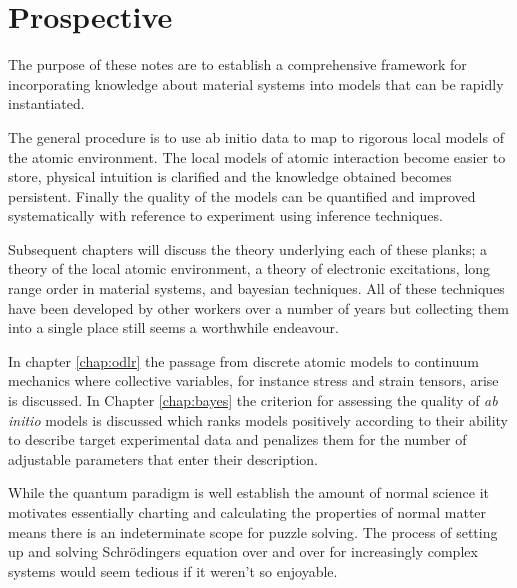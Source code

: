 \section{Prospective}
The purpose of these notes are to establish a comprehensive framework 
for incorporating knowledge about material systems into models that can be rapidly
instantiated.

The general procedure is to use ab initio data to map 
to rigorous local models of the atomic environment. The local models
of atomic interaction become easier to store, physical intuition is clarified
and the knowledge obtained becomes persistent. Finally the quality of the models
can be quantified and improved systematically with reference to experiment using
inference techniques.

Subsequent chapters will discuss the theory underlying each of these planks; a
theory of the local atomic environment, a theory of electronic excitations, long
range order in material systems, and bayesian techniques. All of these techniques
have been developed by other workers over a number of years but collecting 
them into a single place still seems a worthwhile endeavour.

In chapter \ref{chap:odlr} the passage from discrete atomic models to continuum mechanics
where collective variables, for instance stress and strain tensors, arise is discussed. 
In Chapter \ref{chap:bayes} the criterion for assessing the quality of {\it ab initio} 
models is discussed which ranks models positively according to their ability to 
describe target experimental data and penalizes them for the number of 
adjustable parameters that enter their description.

While the quantum paradigm is well establish the amount of normal science it motivates
essentially charting and calculating the properties of normal matter means there is 
an indeterminate scope for puzzle solving. The process of setting up and solving Schr\"odingers
equation over and over for increasingly complex systems would seem tedious if it weren't so enjoyable.


